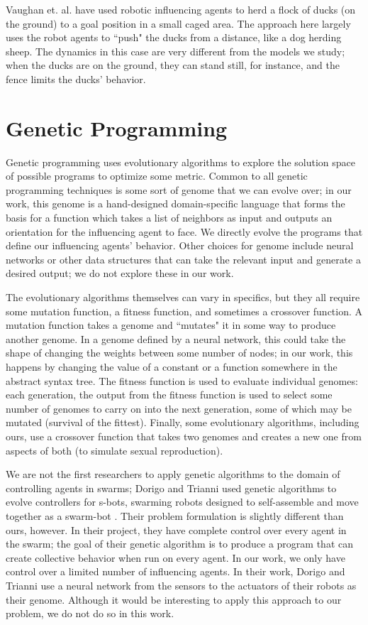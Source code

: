 Vaughan et. al. \cite{vaughan98} have used robotic influencing agents to herd
a flock of ducks (on the ground) to a goal position in a small caged area.
The approach here largely uses the robot agents to ``push" the ducks from a
distance, like a dog herding sheep.
The dynamics in this case are very different from the models we study; when the
ducks are on the ground, they can stand still, for instance, and the fence
limits the ducks' behavior.

\section{Genetic Programming}
Genetic programming \cite{kozaGP} uses evolutionary algorithms to explore the
solution space of possible programs to optimize some metric.
Common to all genetic programming techniques is some sort of genome that we can
evolve over; in our work, this genome is a hand-designed domain-specific
language that forms the basis for a function which takes a list of neighbors as
input and outputs an orientation for the influencing agent to face.
We directly evolve the programs that define our influencing agents' behavior.
Other choices for genome include neural networks or other data structures that
can take the relevant input and generate a desired output; we do not explore
these in our work.

The evolutionary algorithms themselves can vary in specifics, but they all
require some mutation function, a fitness function, and sometimes a crossover
function.
A mutation function takes a genome and ``mutates" it in some way to produce
another genome.
In a genome defined by a neural network, this could take the shape of changing
the weights between some number of nodes; in our work, this happens by changing
the value of a constant or a function somewhere in the abstract syntax tree.
The fitness function is used to evaluate individual genomes: each generation,
the output from the fitness function is used to select some number of genomes
to carry on into the next generation, some of which may be mutated (survival of
the fittest).
Finally, some evolutionary algorithms, including ours, use a crossover function
that takes two genomes and creates a new one from aspects of both (to simulate
sexual reproduction).

We are not the first researchers to apply genetic algorithms to the domain
of controlling agents in swarms; Dorigo and Trianni used genetic algorithms to
evolve controllers for s-bots, swarming robots designed to self-assemble and
move together as a swarm-bot \cite{DorigoSwarmBot}.
Their problem formulation is slightly different than ours, however.
In their project, they have complete control over every agent in the swarm;
the goal of their genetic algorithm is to produce a program that can create
collective behavior when run on every agent.
In our work, we only have control over a limited number of influencing agents.
In their work, Dorigo and Trianni use a neural network from the sensors to the
actuators of their robots as their genome.
Although it would be interesting to apply this approach to our problem, we do
not do so in this work.

